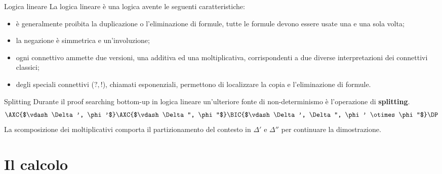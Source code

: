 \documentclass{beamer}
\newcommand{\llten}{\otimes}
\begin{document}
\begin{frame}{Logica lineare}
	La logica lineare è una logica avente le seguenti caratteristiche:
	\begin{itemize}
		\item è generalmente proibita la duplicazione o l'eliminazione di formule, tutte le formule devono essere usate una e una sola volta;
		\item la negazione è simmetrica e un'involuzione;
		\item ogni connettivo ammette due versioni, una additiva ed una moltiplicativa, corrispondenti a due diverse interpretazioni dei connettivi classici;
		\item degli speciali connettivi ($?, !$), chiamati esponenziali, permettono di localizzare la copia e l'eliminazione di formule.
	\end{itemize}
\end{frame}

\begin{frame}{Splitting}
	Durante il proof searching bottom-up in logica lineare un'ulteriore fonte di non-determinismo è l'operazione di \textbf{splitting}.
	$$
	\AXC{$\vdash \Delta', \phi'$}
	\AXC{$\vdash \Delta'', \phi''$}
	\LeftLabel{$\llten$}
	\BIC{$\vdash \Delta', \Delta'', \phi' \llten \phi''$}
	\DP
	$$
	La scomposizione dei moltiplicativi comporta il partizionamento del contesto in $\Delta'$ e $\Delta''$ per continuare la dimostrazione.
\end{frame}

\section{Il calcolo}

% 

% 
\end{document}
